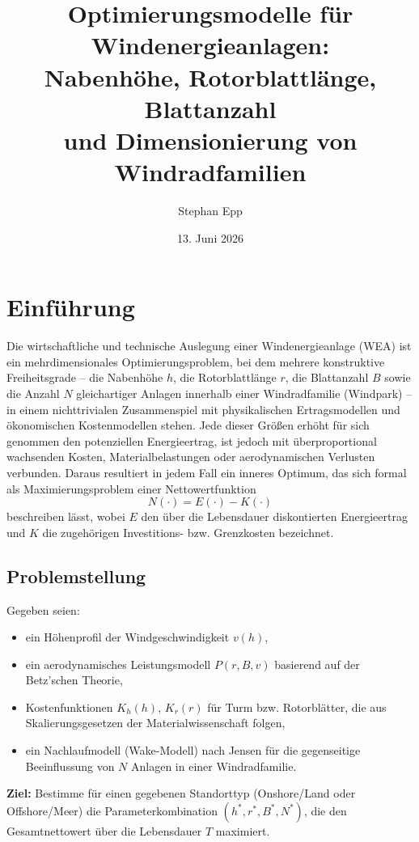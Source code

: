 ﻿\documentclass[a4paper,12pt]{article}
\title{Optimierungsmodelle für Windenergieanlagen:\\
Nabenhöhe, Rotorblattlänge, Blattanzahl\\
und Dimensionierung von Windradfamilien}
\author{Stephan Epp}
\date{13. Juni 2026}
\theoremstyle{definition}
\begin{document}
\maketitle

\tableofcontents
\newpage

\section{Einführung}

Die wirtschaftliche und technische Auslegung einer Windenergieanlage (WEA) ist ein mehrdimensionales Optimierungsproblem, bei dem mehrere konstruktive Freiheitsgrade -- die Nabenhöhe $h$, die Rotorblattlänge $r$, die Blattanzahl $B$ sowie die Anzahl $N$ gleichartiger Anlagen innerhalb einer Windradfamilie (Windpark) -- in einem nichttrivialen Zusammenspiel mit physikalischen Ertragsmodellen und ökonomischen Kostenmodellen stehen. Jede dieser Größen erhöht für sich genommen den potenziellen Energieertrag, ist jedoch mit überproportional wachsenden Kosten, Materialbelastungen oder aerodynamischen Verlusten verbunden. Daraus resultiert in jedem Fall ein inneres Optimum, das sich formal als Maximierungsproblem einer Nettowertfunktion
\[
N(\cdot) = E(\cdot) - K(\cdot)
\]
beschreiben lässt, wobei $E$ den über die Lebensdauer diskontierten Energieertrag und $K$ die zugehörigen Investitions- bzw. Grenzkosten bezeichnet.

\subsection{Problemstellung}

Gegeben seien:
\begin{itemize}
	\item ein Höhenprofil der Windgeschwindigkeit $v(h)$,
	\item ein aerodynamisches Leistungsmodell $P(r, B, v)$ basierend auf der Betz'schen Theorie,
	\item Kostenfunktionen $K_h(h)$, $K_r(r)$ für Turm bzw. Rotorblätter, die aus Skalierungsgesetzen der Materialwissenschaft folgen,
	\item ein Nachlaufmodell (Wake-Modell) nach Jensen für die gegenseitige Beeinflussung von $N$ Anlagen in einer Windradfamilie.
\end{itemize}

\textbf{Ziel:} Bestimme für einen gegebenen Standorttyp (Onshore/Land oder Offshore/Meer) die Parameterkombination $(h^*, r^*, B^*, N^*)$, die den Gesamtnettowert über die Lebensdauer $T$ maximiert.
\end{document}
